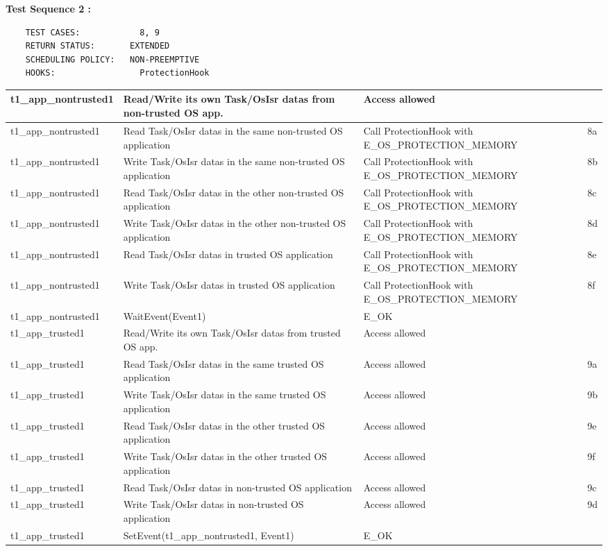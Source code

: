 \documentclass[10pt]{article}
\newlength{\Li}\settowidth{\Li}{Running}
\newlength{\Lii}\setlength{\Lii}{7cm}
\newlength{\Liiii}\setlength{\Liiii}{0.9cm}
\newlength{\Liii}\setlength{\Liii}{\textwidth} \addtolength{\Liii}{-\Li} \addtolength{\Liii}{-\Lii} \addtolength{\Liii}{-\Liiii}
\begin{document}
	\textbf{Test Sequence 2 :}
	\begin{lstlisting}
	TEST CASES:		       8, 9
	RETURN STATUS:	  	 EXTENDED
	SCHEDULING POLICY:   NON-PREEMPTIVE
	HOOKS:		           ProtectionHook
	\end{lstlisting}
	

	\begin{supertabular}{|p{\Li}|p{\Lii}|p{\Liii}|p{\Liiii}|} \hline 
	t1\_app\_nontrusted1	& Read/Write its own Task/OsIsr datas from non-trusted OS app.	& Access allowed									& \\ \hline
	t1\_app\_nontrusted1	& Read Task/OsIsr datas in the same non-trusted OS application 	& Call ProtectionHook with E\_OS\_PROTECTION\_MEMORY	& 8a \\ \hline
	t1\_app\_nontrusted1	& Write Task/OsIsr datas in the same non-trusted OS application 	& Call ProtectionHook with E\_OS\_PROTECTION\_MEMORY	& 8b \\ \hline
	t1\_app\_nontrusted1	& Read Task/OsIsr datas in the other non-trusted OS application 	& Call ProtectionHook with E\_OS\_PROTECTION\_MEMORY	& 8c \\ \hline
	t1\_app\_nontrusted1	& Write Task/OsIsr datas in the other non-trusted OS application 	& Call ProtectionHook with E\_OS\_PROTECTION\_MEMORY	& 8d \\ \hline
	t1\_app\_nontrusted1	& Read Task/OsIsr datas in trusted OS application				 & Call ProtectionHook with E\_OS\_PROTECTION\_MEMORY	& 8e \\ \hline
	t1\_app\_nontrusted1	& Write Task/OsIsr datas in trusted OS application				 & Call ProtectionHook with E\_OS\_PROTECTION\_MEMORY	& 8f \\ \hline
	t1\_app\_nontrusted1	& WaitEvent(Event1)										& E\_OK											& \\ \hline
	
	t1\_app\_trusted1		& Read/Write its own Task/OsIsr datas from trusted OS app.		& Access allowed									& \\ \hline
	t1\_app\_trusted1		& Read Task/OsIsr datas in the same trusted OS application 		& Access allowed									& 9a \\ \hline
	t1\_app\_trusted1		& Write Task/OsIsr datas in the same trusted OS application 		& Access allowed									& 9b \\ \hline
	t1\_app\_trusted1		& Read Task/OsIsr datas in the other trusted OS application 		& Access allowed									& 9e \\ \hline
	t1\_app\_trusted1		& Write Task/OsIsr datas in the other trusted OS application 		& Access allowed									& 9f \\ \hline
	t1\_app\_trusted1		& Read Task/OsIsr datas in non-trusted OS application	 		& Access allowed									& 9c \\ \hline
	t1\_app\_trusted1		& Write Task/OsIsr datas in non-trusted OS application	 		& Access allowed									& 9d \\ \hline
	t1\_app\_trusted1		& SetEvent(t1\_app\_nontrusted1, Event1)					& E\_OK											& \\ \hline
	

\end{supertabular}
\end{document}

